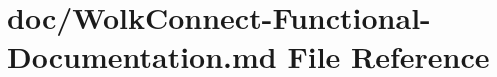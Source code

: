 \hypertarget{_wolk_connect-_functional-_documentation_8md}{}\section{doc/\+Wolk\+Connect-\/\+Functional-\/\+Documentation.md File Reference}
\label{_wolk_connect-_functional-_documentation_8md}
